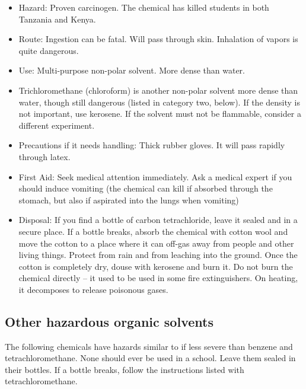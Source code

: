 \begin{itemize}

\item{Hazard: Proven carcinogen. 
The chemical has killed students in both Tanzania and Kenya.}

\item{Route: Ingestion can be fatal. 
Will pass through skin. 
Inhalation of vapors is quite dangerous.}

\item{Use: Multi-purpose non-polar solvent. 
More dense than water.}

\item{Trichloromethane (chloroform) is 
another non-polar solvent more dense than water, 
though still dangerous (listed in category two, below). 
If the density is not important, use kerosene. 
If the solvent must not be flammable, 
consider a different experiment.}

\item{Precautions if it needs handling: Thick rubber gloves. 
It will pass rapidly through latex.}

\item{First Aid: Seek medical attention immediately. 
Ask a medical expert if you should induce vomiting 
(the chemical can kill if absorbed through the stomach, 
but also if aspirated into the lungs when vomiting)}

\item{Disposal: If you find a bottle of carbon tetrachloride, 
leave it sealed and in a secure place. 
If a bottle breaks, 
absorb the chemical with cotton wool 
and move the cotton to a place where it can off-gas 
away from people and other living things. 
Protect from rain and from leaching into the ground. 
Once the cotton is completely dry, 
douse with kerosene and burn it. 
Do not burn the chemical directly – 
it used to be used in some fire extinguishers. 
On heating, it decomposes to release poisonous gases.}

\end{itemize}

\subsection{Other hazardous organic solvents}
The following chemicals have hazards similar to 
if less severe than benzene and tetrachloromethane. 
None should ever be used in a school. 
Leave them sealed in their bottles. 
If a bottle breaks, follow the instructions 
listed with tetrachloromethane.

